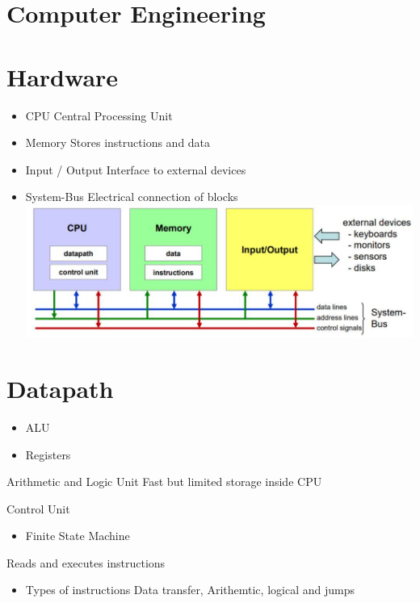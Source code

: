 \section{Computer Engineering}

\section*{Hardware}
\begin{itemize}
  \item CPU Central Processing Unit
  \item Memory Stores instructions and data
  \item Input / Output Interface to external devices
  \item System-Bus Electrical connection of blocks\\
\includegraphics[width=\linewidth]{images/2024_12_29_79e6b22f503fb7b4f718g-01(1)}
\end{itemize}

\section*{Datapath}
\begin{itemize}
  \item ALU
  \item Registers
\end{itemize}

Arithmetic and Logic Unit Fast but limited storage inside CPU

Control Unit

\begin{itemize}
  \item Finite State Machine
\end{itemize}

Reads and executes instructions

\begin{itemize}
  \item Types of instructions Data transfer, Arithemtic, logical and jumps
\end{itemize}

